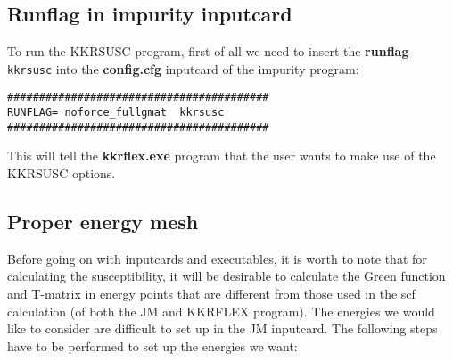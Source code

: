 \documentclass[a4paper,10pt,fullpage]{report}
\begin{document}
\subsection{Runflag in impurity inputcard}



To run the KKRSUSC program, first of all we need to insert the \textbf{runflag} \verb|kkrsusc|
into the \textbf{config.cfg} inputcard of the impurity program:
\begin{verbatim}
#########################################
RUNFLAG= noforce_fullgmat  kkrsusc
#########################################
\end{verbatim}
This will tell the \textbf{kkrflex.exe} program that the user wants to make use of the
KKRSUSC options. 


\subsection{Proper energy mesh}
\label{subsec:emeshdat}


Before going on with inputcards and executables, it is worth to
note that for calculating the susceptibility, 
it will be desirable to calculate
the Green function and T-matrix in 
energy points that are different from those used in the scf 
calculation (of both the JM and KKRFLEX program).
The energies we would like to consider are
difficult to set up in
the JM inputcard. 
The following steps have to be performed
to set up the energies we want:
\end{document}

